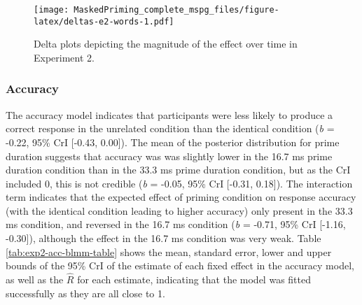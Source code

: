 \documentclass[
  english,
  man,floatsintext]{apa6}
\begin{document}
\begin{figure}
\centering
\texttt{[image: MaskedPriming\_complete\_mspg\_files/figure-latex/deltas-e2-words-1.pdf]}
\caption{\label{fig:deltas-e2-words}Delta plots depicting the magnitude of the effect over time in Experiment 2.}
\end{figure}

\hypertarget{accuracy-1}{%
\subsubsection{Accuracy}\label{accuracy-1}}

The accuracy model indicates that participants were less likely to produce a correct response in the unrelated condition than the identical condition (\emph{b} = -0.22, 95\% CrI {[}-0.43, 0.00{]}). The mean of the posterior distribution for prime duration suggests that accuracy was was slightly lower in the 16.7 ms prime duration condition than in the 33.3 ms prime duration condition, but as the CrI included 0, this is not credible (\emph{b} = -0.05, 95\% CrI {[}-0.31, 0.18{]}). The interaction term indicates that the expected effect of priming condition on response accuracy (with the identical condition leading to higher accuracy) only present in the 33.3 ms condition, and reversed in the 16.7 ms condition (\emph{b} = -0.71, 95\% CrI {[}-1.16, -0.30{]}), although the effect in the 16.7 ms condition was very weak. Table \ref{tab:exp2-acc-blmm-table} shows the mean, standard error, lower and upper bounds of the 95\% CrI of the estimate of each fixed effect in the accuracy model, as well as the \(\hat{R}\) for each estimate, indicating that the model was fitted successfully as they are all close to 1.
\end{document}
